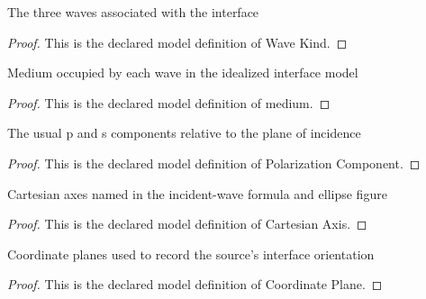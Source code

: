 \begin{definition}
  \label{def:physics:phyx-mini-0104:phyxminiproblems-problemphyxmini0104-wavekind}
  The three waves associated with the interface
\end{definition}
\begin{proof}
  This is the declared model definition of Wave Kind.
\end{proof}
\begin{definition}[medium]
  \label{def:physics:phyx-mini-0104:phyxminiproblems-problemphyxmini0104-wavekind-medium}
  Medium occupied by each wave in the idealized interface model
\end{definition}
\begin{proof}
  This is the declared model definition of medium.
\end{proof}
\begin{definition}
  \label{def:physics:phyx-mini-0104:phyxminiproblems-problemphyxmini0104-polarizationcomponent}
  The usual p and s components relative to the plane of incidence
\end{definition}
\begin{proof}
  This is the declared model definition of Polarization Component.
\end{proof}
\begin{definition}
  \label{def:physics:phyx-mini-0104:phyxminiproblems-problemphyxmini0104-cartesianaxis}
  Cartesian axes named in the incident-wave formula and ellipse figure
\end{definition}
\begin{proof}
  This is the declared model definition of Cartesian Axis.
\end{proof}
\begin{definition}
  \label{def:physics:phyx-mini-0104:phyxminiproblems-problemphyxmini0104-coordinateplane}
  Coordinate planes used to record the source's interface orientation
\end{definition}
\begin{proof}
  This is the declared model definition of Coordinate Plane.
\end{proof}
